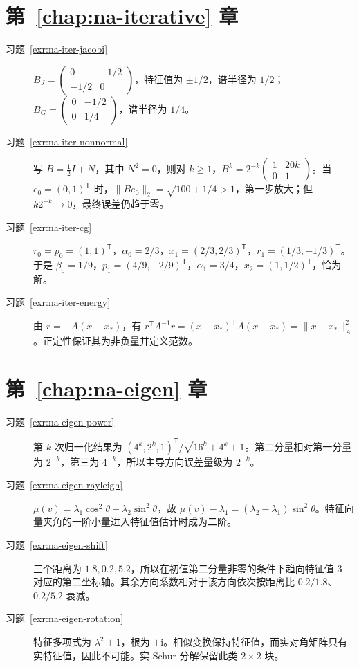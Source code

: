 \documentclass[UTF8,12pt,a4paper,fontset=fandol]{ctexbook}
\begin{document}
\section{第~\ref{chap:na-iterative} 章}
\begin{description}
\item[习题~\ref{exr:na-iter-jacobi}] $B_J=\begin{pmatrix}0&-1/2\\-1/2&0\end{pmatrix}$，特征值为 $\pm1/2$，谱半径为 $1/2$；$B_G=\begin{pmatrix}0&-1/2\\0&1/4\end{pmatrix}$，谱半径为 $1/4$。
\item[习题~\ref{exr:na-iter-nonnormal}] 写 $B=\tfrac12I+N$，其中 $N^2=0$，则对 $k\ge1$，$B^k=2^{-k}\begin{pmatrix}1&20k\\0&1\end{pmatrix}$。当 $e_0=(0,1)^{\mathsf T}$ 时，$\|Be_0\|_2=\sqrt{100+1/4}>1$，第一步放大；但 $k2^{-k}\to0$，最终误差仍趋于零。
\item[习题~\ref{exr:na-iter-cg}] $r_0=p_0=(1,1)^{\mathsf T}$，$\alpha_0=2/3$，$x_1=(2/3,2/3)^{\mathsf T}$，$r_1=(1/3,-1/3)^{\mathsf T}$。于是 $\beta_0=1/9$，$p_1=(4/9,-2/9)^{\mathsf T}$，$\alpha_1=3/4$，$x_2=(1,1/2)^{\mathsf T}$，恰为解。
\item[习题~\ref{exr:na-iter-energy}] 由 $r=-A(x-x_*)$，有 $r^{\mathsf T}A^{-1}r=(x-x_*)^{\mathsf T}A(x-x_*)=\|x-x_*\|_A^2$。正定性保证其为非负量并定义范数。
\end{description}

\section{第~\ref{chap:na-eigen} 章}
\begin{description}
\item[习题~\ref{exr:na-eigen-power}] 第 $k$ 次归一化结果为 $(4^k,2^k,1)^{\mathsf T}/\sqrt{16^k+4^k+1}$。第二分量相对第一分量为 $2^{-k}$，第三为 $4^{-k}$，所以主导方向误差量级为 $2^{-k}$。
\item[习题~\ref{exr:na-eigen-rayleigh}] $\mu(v)=\lambda_1\cos^2\theta+\lambda_2\sin^2\theta$，故 $\mu(v)-\lambda_1=(\lambda_2-\lambda_1)\sin^2\theta$。特征向量夹角的一阶小量进入特征值估计时成为二阶。
\item[习题~\ref{exr:na-eigen-shift}] 三个距离为 $1.8,0.2,5.2$，所以在初值第二分量非零的条件下趋向特征值 $3$ 对应的第二坐标轴。其余方向系数相对于该方向依次按距离比 $0.2/1.8$、$0.2/5.2$ 衰减。
\item[习题~\ref{exr:na-eigen-rotation}] 特征多项式为 $\lambda^2+1$，根为 $\pm\mathrm i$。相似变换保持特征值，而实对角矩阵只有实特征值，因此不可能。实 Schur 分解保留此类 $2\times2$ 块。
\end{description}
\end{document}
